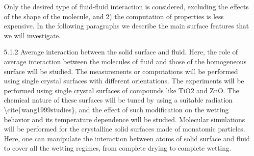 Only the desired type of fluid-fluid interaction is considered, excluding the effects of the shape of the molecule, and 2) the computation of properties is less expensive.  In the following paragraphs we describe the main surface features that we will investigate.
\par 5.1.2 Average interaction between the solid surface and fluid. Here, the role of average interaction between the molecules of fluid and those of the homogeneous surface will be studied. The measurements or computations will be performed using single crystal surfaces with different orientations. The experiments will be performed using single crystal surfaces of compounds like TiO2 and ZnO. The chemical nature of these surfaces will be tuned by using a suitable radiation \textbackslash cite\{wang1999studies\}, and the effect of such modification on the  wetting behavior and its temperature dependence will be studied. Molecular simulations will be performed for the crystalline solid surfaces made of monatomic particles. Here, one can manipulate the interaction between atoms of solid surface and fluid to cover all the wetting regimes, from complete drying to complete wetting.
